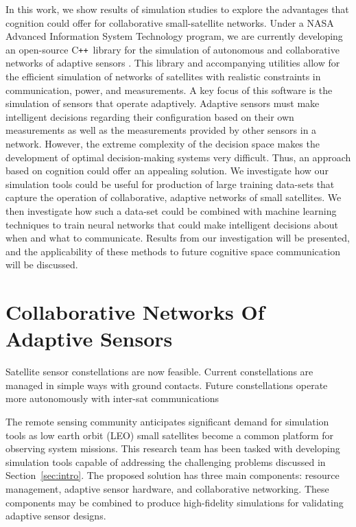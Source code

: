 \documentclass[conference]{IEEEtran}
\newcommand{\cpp}{C\texttt{++}~}
\begin{document}
In this work, we show results of simulation studies to explore the advantages that cognition could offer for collaborative small-satellite networks.  Under a NASA Advanced Information System Technology program, we are currently developing an open-source \cpp library for the simulation of autonomous and collaborative networks of adaptive sensors \cite{ref6}.  This library and accompanying utilities allow for the efficient simulation of networks of satellites with realistic constraints in communication, power, and measurements.  A key focus of this software is the simulation of sensors that operate adaptively.  Adaptive sensors must make intelligent decisions regarding their configuration based on their own measurements as well as the measurements provided by other sensors in a network.  However, the extreme complexity of the decision space makes the development of optimal decision-making systems very difficult.  Thus, an approach based on cognition could offer an appealing solution.  We investigate how our simulation tools could be useful for production of large training data-sets that capture the operation of collaborative, adaptive networks of small satellites.  We then investigate how such a data-set could be combined with machine learning techniques to train neural networks that could make intelligent decisions about when and what to communicate.  Results from our investigation will be presented, and the applicability of these methods to future cognitive space communication will be discussed.


\section{Collaborative Networks Of Adaptive Sensors}
\label{sec:overview}

{ \color{red} Satellite sensor constellations are now feasible.  Current constellations are managed in simple ways with ground contacts.  Future constellations operate more autonomously with inter-sat communications}

The remote sensing community anticipates significant demand for simulation tools as low earth orbit (LEO) small satellites become a common platform for observing system missions.  This research team has been tasked with developing simulation tools capable of addressing the challenging problems discussed in Section~\ref{sec:intro}.  The proposed solution has three main components: resource management, adaptive sensor hardware, and collaborative networking.  These components may be combined to produce high-fidelity simulations for validating adaptive sensor designs.
\end{document}
